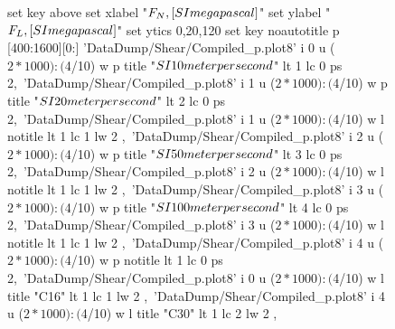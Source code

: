 \documentclass[5p]{elsarticle}
\begin{document}
\begin{figure}[htp]
    	\begin{center}
		\begin{gnuplot}[terminal=epslatex, terminaloptions={size \SERFigwidth cm, \SERFigheight cm color solid}]
			set key above
			set xlabel "$F_N \\, [\\SI{}{\\mega\\pascal}]$"
			set ylabel "$F_L \\, [\\SI{}{\\mega\\pascal}]$"
			set ytics 0,20,120
			set key noautotitle
            p [400:1600][0:]	'DataDump/Shear/Compiled_p.plot8' i 0 u ($2*1000):($4/10) w p title "$\\SI{10}{\\meter\\per\\second}$" lt 1 lc 0 ps 2,\
                'DataDump/Shear/Compiled_p.plot8' i 1 u ($2*1000):($4/10) w p title "$\\SI{20}{\\meter\\per\\second}$" lt 2 lc 0 ps 2,\
	    		'DataDump/Shear/Compiled_p.plot8' i 1 u ($2*1000):($4/10) w l notitle  lt 1 lc 1 lw 2	,\
                'DataDump/Shear/Compiled_p.plot8' i 2 u ($2*1000):($4/10) w p title "$\\SI{50}{\\meter\\per\\second}$" lt 3 lc 0 ps 2,\
	    		'DataDump/Shear/Compiled_p.plot8' i 2 u ($2*1000):($4/10) w l notitle  lt 1 lc 1 lw 2	,\
                'DataDump/Shear/Compiled_p.plot8' i 3 u ($2*1000):($4/10) w p title "$\\SI{100}{\\meter\\per\\second}$" lt 4 lc 0 ps 2,\
	    		'DataDump/Shear/Compiled_p.plot8' i 3 u ($2*1000):($4/10) w l notitle  lt 1 lc 1 lw 2 ,\
                'DataDump/Shear/Compiled_p.plot8' i 4 u ($2*1000):($4/10) w p notitle  lt 1 lc 0 ps 2,\
	    		'DataDump/Shear/Compiled_p.plot8' i 0 u ($2*1000):($4/10) w l title "C16" lt 1 lc 1 lw 2 ,\
	    		'DataDump/Shear/Compiled_p.plot8' i 4 u ($2*1000):($4/10) w l title "C30" lt 1 lc 2 lw 2 ,\	    		

\end{gnuplot}
\end{center}
\end{figure}
\end{document}
